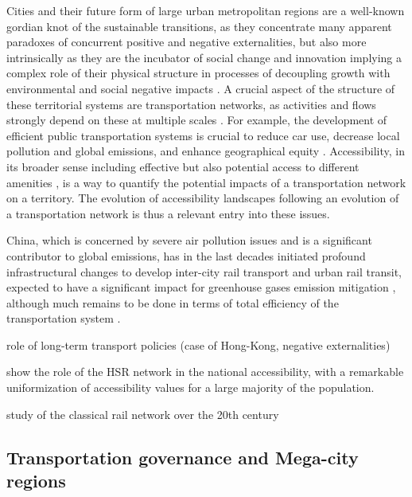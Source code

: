 Cities and their future form of large urban metropolitan regions are a well-known gordian knot of the sustainable transitions, as they concentrate many apparent paradoxes of concurrent positive and negative externalities, but also more intrinsically as they are the incubator of social change and innovation \citep{pumain2009innovation} implying a complex role of their physical structure in processes of decoupling growth with environmental and social negative impacts \citep{bergeaud2018bel}. A crucial aspect of the structure of these territorial systems are transportation networks, as activities and flows strongly depend on these at multiple scales \citep{raimbault2018caracterisation}. For example, the development of efficient public transportation systems is crucial to reduce car use, decrease local pollution and global emissions, and enhance geographical equity \citep{sinha2003sustainability}. Accessibility, in its broader sense including effective but also potential access to different amenities \citep{bavoux2005geographie}, is a way to quantify the potential impacts of a transportation network on a territory. The evolution of accessibility landscapes following an evolution of a transportation network is thus a relevant entry into these issues.

China, which is concerned by severe air pollution issues and is a significant contributor to global emissions, has in the last decades initiated profound infrastructural changes to develop inter-city rail transport and urban rail transit, expected to have a significant impact for greenhouse gases emission mitigation \citep{han2008system}, although much remains to be done in terms of total efficiency of the transportation system \citep{chang2013environmental}.

\cite{tang2008impact} role of long-term transport policies (case of Hong-Kong, negative externalities)


\cite{jiao2014impacts} show the role of the HSR network in the national accessibility, with a remarkable uniformization of accessibility values for a large majority of the population.


\cite{hou2011transport}

\cite{lyu2016developing}


\cite{wang2009spatiotemporal} study of the classical rail network over the 20th century

\subsection{Transportation governance and Mega-city regions}

